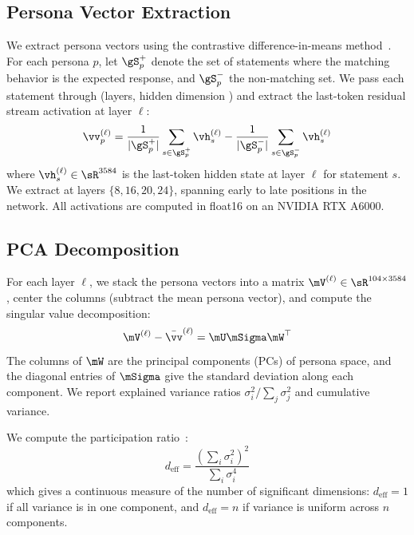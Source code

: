 \subsection{Persona Vector Extraction}
\label{sec:extraction}

We extract persona vectors using the contrastive difference-in-means method~\citep{zou2023representation, chen2025persona}. For each persona $p$, let $\gS_p^+$ denote the set of statements where the matching behavior is the expected response, and $\gS_p^-$ the non-matching set. We pass each statement through \qwen (\nlayers layers, hidden dimension \hdim) and extract the last-token residual stream activation at layer $\ell$:
\begin{equation}
    \vv_p^{(\ell)} = \frac{1}{|\gS_p^+|} \sum_{s \in \gS_p^+} \vh_s^{(\ell)} - \frac{1}{|\gS_p^-|} \sum_{s \in \gS_p^-} \vh_s^{(\ell)}
    \label{eq:persona_vector}
\end{equation}
where $\vh_s^{(\ell)} \in \sR^{3584}$ is the last-token hidden state at layer $\ell$ for statement $s$. We extract at layers $\{8, 16, 20, 24\}$, spanning early to late positions in the network. All activations are computed in float16 on an NVIDIA RTX A6000.

\subsection{PCA Decomposition}
\label{sec:pca}

For each layer $\ell$, we stack the \npersonas persona vectors into a matrix $\mV^{(\ell)} \in \sR^{104 \times 3584}$, center the columns (subtract the mean persona vector), and compute the singular value decomposition:
\begin{equation}
    \mV^{(\ell)} - \bar{\vv}^{(\ell)} = \mU \mSigma \mW^\top
    \label{eq:svd}
\end{equation}
The columns of $\mW$ are the principal components (PCs) of persona space, and the diagonal entries of $\mSigma$ give the standard deviation along each component. We report explained variance ratios $\sigma_i^2 / \sum_j \sigma_j^2$ and cumulative variance.

 We compute the participation ratio~\citep{gao2017theory}:
\begin{equation}
    d_{\text{eff}} = \frac{\left(\sum_i \sigma_i^2\right)^2}{\sum_i \sigma_i^4}
    \label{eq:participation_ratio}
\end{equation}
which gives a continuous measure of the number of significant dimensions: $d_{\text{eff}} = 1$ if all variance is in one component, and $d_{\text{eff}} = n$ if variance is uniform across $n$ components.

